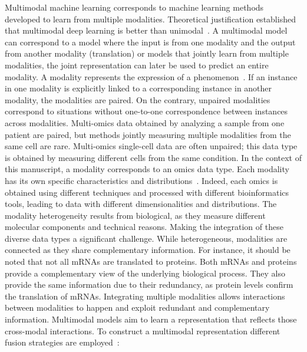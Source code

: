 \documentclass[../main.tex]{subfiles}
\begin{document}
	Multimodal machine learning corresponds to machine learning methods developed to learn from multiple modalities.
	Theoretical justification established that multimodal deep learning is better than unimodal~\cite{NEURIPS2021_5aa3405a}.
	A multimodal model can correspond to a model where the input is from one modality and the output from another modality (translation) or models that jointly learn from multiple modalities, the joint representation can later be used to predict an entire modality.
	A modality represents the expression of a phenomenon~\cite{MML_morency}.
	If an instance in one modality is explicitly linked to a corresponding instance in another modality, the modalities are paired.
	On the contrary, unpaired modalities correspond to situations without one-to-one correspondence between instances across modalities.
	Multi-omics data obtained by analyzing a sample from one patient are paired, but methods jointly measuring multiple modalities from the same cell are rare.
	Multi-omics single-cell data are often unpaired; this data type is obtained by measuring different cells from the same condition.
	In the context of this manuscript, a modality corresponds to an omics data type.
	Each modality has its own specific characteristics and distributions~\cite{Tarazona2021}.
	Indeed, each omics is obtained using different techniques and processed with different bioinformatics tools, leading to data with different dimensionalities and distributions.
	The modality heterogeneity results from biological, as they measure different molecular components and technical reasons.
	Making the integration of these diverse data types a significant challenge.
	While heterogeneous, modalities are connected as they share complementary information.
	For instance, it should be noted that not all mRNAs are translated to proteins.
	Both mRNAs and proteins provide a complementary view of the underlying biological process.
	They also provide the same information due to their redundancy, as protein levels confirm the translation of mRNAs.
	Integrating multiple modalities allows interactions between modalities to happen and exploit redundant and complementary information.
	Multimodal models aim to learn a representation that reflects those cross-modal interactions.
	To construct a multimodal representation different fusion strategies are employed~\cite{MML_morency,MMLSurvey}:
\end{document}
